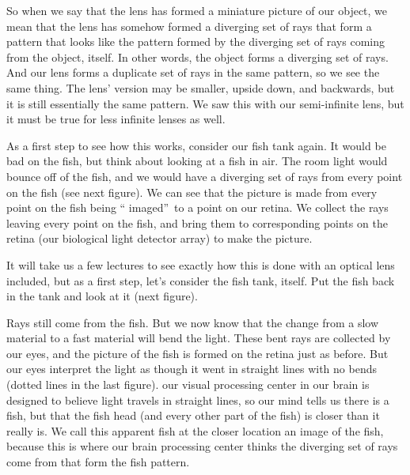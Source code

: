 \documentclass{article}
\begin{document}
So when we say that the lens has formed a miniature picture of our object,
we mean that the lens has somehow formed a diverging set of rays that form a
pattern that looks like the pattern formed by the diverging set of rays
coming from the object, itself. In other words, the object forms a diverging
set of rays. And our lens forms a duplicate set of rays in the same pattern,
so we see the same thing. The lens' version may be smaller, upside down, and
backwards, but it is still essentially the same pattern. We saw this with
our semi-infinite lens, but it must be true for less infinite lenses as well.

As a first step to see how this works, consider our fish tank again. It
would be bad on the fish, but think about looking at a fish in air. The room
light would bounce off of the fish, and we would have a diverging set of
rays from every point on the fish (see next figure). We can see that the picture is
made from every point on the fish being \textquotedblleft
imaged\textquotedblright\ to a point on our retina. We collect the rays
leaving every point on the fish, and bring them to corresponding points on
the retina (our biological light detector array) to make the picture.

It will take us a few lectures to see exactly how this is done with an
optical lens included, but as a first step, let's consider the fish tank,
itself. Put the fish back in the tank and look at it (next figure).

Rays still come from the fish.
But we now know that the change from a slow material to a fast material will
bend the light. These bent rays are collected by our eyes, and the picture
of the fish is formed on the retina just as before. But our eyes interpret
the light as though it went in straight lines with no bends (dotted lines in
the last figure). our visual processing center in our brain is designed to
believe light travels in straight lines, so our mind tells us there is a
fish, but that the fish head (and every other part of the fish) is closer
than it really is. We call this apparent fish at the closer location an
image of the fish, because this is where our brain processing center thinks
the diverging set of rays come from that form the fish pattern.
\end{document}

